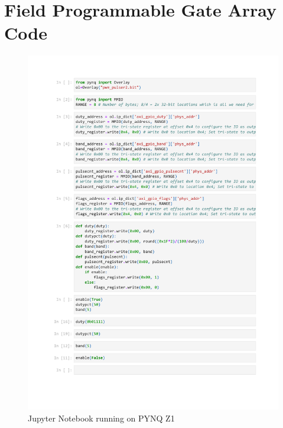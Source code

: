 \section{Field Programmable Gate Array Code}
\begin{figure}[htbp!]
	\centering
	\includegraphics[height=.8\textheight]{Figures/appendix/fpga/pulser.pdf}
	\caption{Jupyter Notebook running on PYNQ Z1}
	\label{fig:app_jupyter_notebook}
\end{figure}
